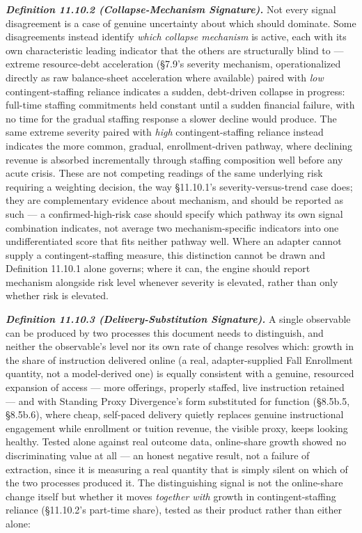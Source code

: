 \documentclass[
]{article}
\begin{document}
\emph{\textbf{Definition 11.10.2 (Collapse-Mechanism Signature).}} Not
every signal disagreement is a case of genuine uncertainty about which
should dominate. Some disagreements instead identify \emph{which
collapse mechanism} is active, each with its own characteristic leading
indicator that the others are structurally blind to --- extreme
resource-debt acceleration (§7.9's severity mechanism, operationalized
directly as raw balance-sheet acceleration where available) paired with
\emph{low} contingent-staffing reliance indicates a sudden, debt-driven
collapse in progress: full-time staffing commitments held constant until
a sudden financial failure, with no time for the gradual staffing
response a slower decline would produce. The same extreme severity
paired with \emph{high} contingent-staffing reliance instead indicates
the more common, gradual, enrollment-driven pathway, where declining
revenue is absorbed incrementally through staffing composition well
before any acute crisis. These are not competing readings of the same
underlying risk requiring a weighting decision, the way §11.10.1's
severity-versus-trend case does; they are complementary evidence about
mechanism, and should be reported as such --- a confirmed-high-risk case
should specify which pathway its own signal combination indicates, not
average two mechanism-specific indicators into one undifferentiated
score that fits neither pathway well. Where an adapter cannot supply a
contingent-staffing measure, this distinction cannot be drawn and
Definition 11.10.1 alone governs; where it can, the engine should report
mechanism alongside risk level whenever severity is elevated, rather
than only whether risk is elevated.

\emph{\textbf{Definition 11.10.3 (Delivery-Substitution Signature).}} A
single observable can be produced by two processes this document needs
to distinguish, and neither the observable's level nor its own rate of
change resolves which: growth in the share of instruction delivered
online (a real, adapter-supplied Fall Enrollment quantity, not a
model-derived one) is equally consistent with a genuine, resourced
expansion of access --- more offerings, properly staffed, live
instruction retained --- and with Standing Proxy Divergence's form
substituted for function (§8.5b.5, §8.5b.6), where cheap, self-paced
delivery quietly replaces genuine instructional engagement while
enrollment or tuition revenue, the visible proxy, keeps looking healthy.
Tested alone against real outcome data, online-share growth showed no
discriminating value at all --- an honest negative result, not a failure
of extraction, since it is measuring a real quantity that is simply
silent on which of the two processes produced it. The distinguishing
signal is not the online-share change itself but whether it moves
\emph{together with} growth in contingent-staffing reliance (§11.10.2's
part-time share), tested as their product rather than either alone:
\end{document}
